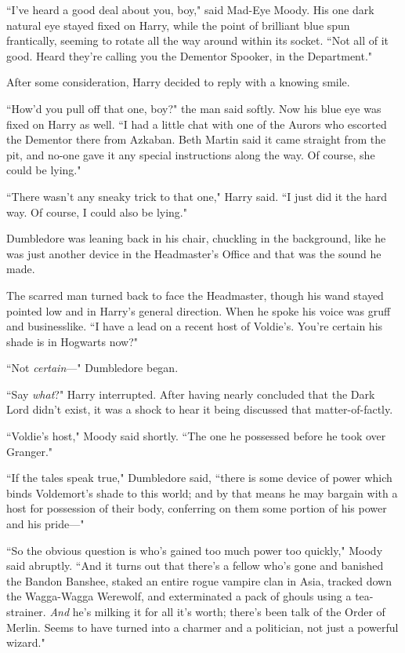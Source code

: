``I've heard a good deal about you, boy," said Mad-Eye Moody. His one dark natural eye stayed fixed on Harry, while the point of brilliant blue spun frantically, seeming to rotate all the way around within its socket. ``Not all of it good. Heard they're calling you the Dementor Spooker, in the Department."

After some consideration, Harry decided to reply with a knowing smile.

``How'd you pull off that one, boy?" the man said softly. Now his blue eye was fixed on Harry as well. ``I had a little chat with one of the Aurors who escorted the Dementor there from Azkaban. Beth Martin said it came straight from the pit, and no-one gave it any special instructions along the way. Of course, she could be lying."

``There wasn't any sneaky trick to that one," Harry said. ``I just did it the hard way. Of course, I could also be lying."

Dumbledore was leaning back in his chair, chuckling in the background, like he was just another device in the Headmaster's Office and that was the sound he made.

The scarred man turned back to face the Headmaster, though his wand stayed pointed low and in Harry's general direction. When he spoke his voice was gruff and businesslike. ``I have a lead on a recent host of Voldie's. You're certain his shade is in Hogwarts now?"

``Not \emph{certain}—" Dumbledore began.

``Say \emph{what}?" Harry interrupted. After having nearly concluded that the Dark Lord didn't exist, it was a shock to hear it being discussed that matter-of-factly.

``Voldie's host," Moody said shortly. ``The one he possessed before he took over Granger."

``If the tales speak true," Dumbledore said, ``there is some device of power which binds Voldemort's shade to this world; and by that means he may bargain with a host for possession of their body, conferring on them some portion of his power and his pride—"

``So the obvious question is who's gained too much power too quickly," Moody said abruptly. ``And it turns out that there's a fellow who's gone and banished the Bandon Banshee, staked an entire rogue vampire clan in Asia, tracked down the Wagga-Wagga Werewolf, and exterminated a pack of ghouls using a tea-strainer. \emph{And} he's milking it for all it's worth; there's been talk of the Order of Merlin. Seems to have turned into a charmer and a politician, not just a powerful wizard."

